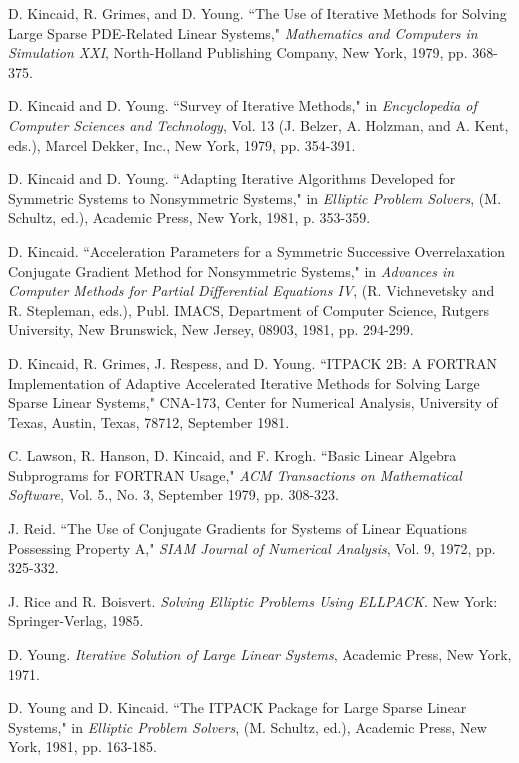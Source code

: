 \begin{thebibliography}{99}
 D. Kincaid, R. Grimes, and D. Young. ``The Use of 
 Iterative Methods for Solving Large Sparse PDE-Related Linear 
 Systems," {\em Mathematics and Computers in Simulation XXI}, 
 North-Holland Publishing Company, New York, 1979, pp. 368-375.
 
 D. Kincaid and D. Young. ``Survey of Iterative Methods," in
 {\em Encyclopedia of Computer Sciences and Technology}, Vol. 13
 (J. Belzer, A. Holzman, and A. Kent, eds.), Marcel Dekker,
 Inc., New York, 1979, pp. 354-391.
 
 D. Kincaid and D. Young. ``Adapting Iterative Algorithms
 Developed for Symmetric Systems to Nonsymmetric Systems," in
 {\em Elliptic Problem Solvers}, (M. Schultz, ed.), Academic Press,
 New York, 1981, p. 353-359.
 
 D. Kincaid. ``Acceleration Parameters for a Symmetric
 Successive Overrelaxation Conjugate Gradient Method for
 Nonsymmetric Systems," in {\em Advances in Computer Methods for
 Partial Differential Equations IV}, (R. Vichnevetsky and
 R. Stepleman, eds.), Publ. IMACS, Department of Computer Science,
 Rutgers University, New Brunswick, New Jersey, 08903, 1981, pp.
 294-299.
 
 D. Kincaid, R. Grimes, J. Respess, and D. Young. ``ITPACK
 2B: A FORTRAN Implementation of Adaptive Accelerated
 Iterative Methods for Solving Large Sparse Linear Systems,"
 CNA-173, Center for Numerical Analysis, University of Texas,
 Austin, Texas, 78712, September 1981.
 
 C. Lawson, R. Hanson, D. Kincaid, and F. Krogh. ``Basic
 Linear Algebra Subprograms for FORTRAN Usage," {\em ACM
 Transactions on Mathematical Software}, Vol. 5., No. 3,
 September 1979, pp. 308-323.
 
 J. Reid. ``The Use of Conjugate Gradients for Systems of
 Linear Equations Possessing Property A," {\em SIAM Journal of Numerical
 Analysis}, Vol. 9, 1972, pp. 325-332.
 
 J. Rice and R. Boisvert. {\em Solving Elliptic
 Problems Using ELLPACK}. New York: Springer-Verlag, 1985.
 
 D. Young. {\em Iterative Solution of Large Linear Systems},
 Academic Press, New York, 1971.
 
 D. Young and D. Kincaid. ``The ITPACK Package for Large
 Sparse Linear Systems," in {\em Elliptic Problem Solvers}, (M.
 Schultz, ed.), Academic Press, New York, 1981, pp. 163-185.

\end{thebibliography}
 

